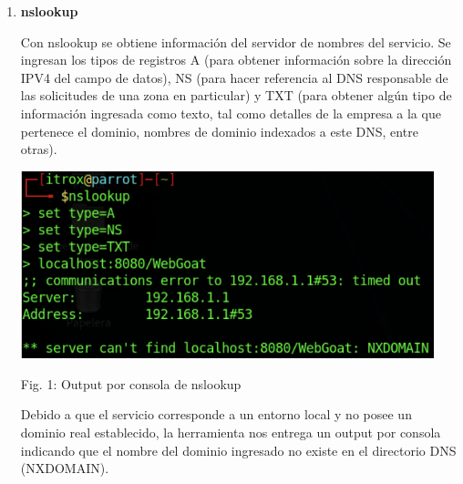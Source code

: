 \documentclass[12pt,oneside,a4paper]{book}
\begin{document}
    \begin{enumerate}
        \begin{enumerate}
            \item \textbf{nslookup}
            
            \vspace{1em}
            
            \newline
            \hspace{20pt}
            Con nslookup se obtiene información del servidor de nombres del servicio. Se ingresan los tipos de registros A (para obtener información sobre la dirección IPV4 del campo de datos), NS (para hacer referencia al DNS responsable de las solicitudes de una zona en particular) y TXT (para obtener algún tipo de información ingresada como texto, tal como detalles de la empresa a la que pertenece el dominio, nombres de dominio indexados a este DNS, entre otras).
            
            \vspace{2em}
            
            \begin{center}
                \includegraphics[width=12cm]{img/nslookup.png}
                \vspace{0.1em}
                
                Fig. 1: Output por consola de nslookup
            \end{center}
            
            \newpage
    
            \hspace{20pt}
            Debido a que el servicio corresponde a un entorno local y no posee un dominio real establecido, la herramienta nos entrega un output por consola indicando que el nombre del dominio ingresado no existe en el directorio DNS (NXDOMAIN).
            
            \vspace{2em}
            

\end{enumerate}
\end{enumerate}
\end{document}
